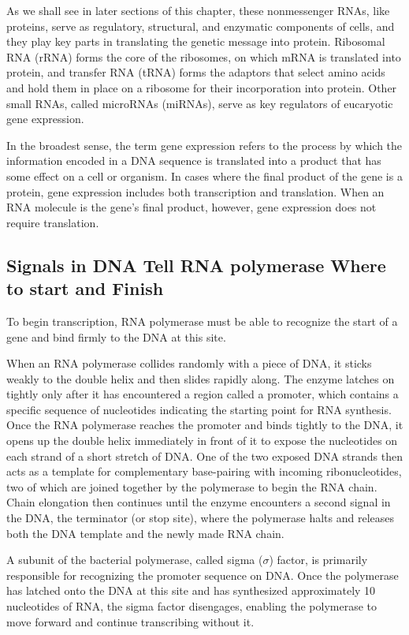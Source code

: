 As we shall see in later sections of this chapter, these nonmessenger RNAs,
like proteins, serve as regulatory, structural, and enzymatic components
of cells, and they play key parts in translating the genetic message into
protein. Ribosomal RNA (rRNA) forms the core of the ribosomes, on which
mRNA is translated into protein, and transfer RNA (tRNA) forms the adaptors
that select amino acids and hold them in place on a ribosome for
their incorporation into protein. Other small RNAs, called microRNAs
(miRNAs), serve as key regulators of eucaryotic gene expression.

In the broadest sense, the term gene expression refers to the process
by which the information encoded in a DNA sequence is translated into
a product that has some effect on a cell or organism. In cases where
the final product of the gene is a protein, gene expression includes both
transcription and translation. When an RNA molecule is the gene’s final
product, however, gene expression does not require translation.

\subsection{Signals in DNA Tell RNA polymerase Where to start and Finish}

To begin transcription, RNA polymerase must be able to recognize the start of
a gene and bind firmly to the DNA at this site.

When an RNA polymerase collides randomly with a piece of DNA,
it sticks weakly to the double helix and then slides rapidly along. The
enzyme latches on tightly only after it has encountered a region called a
promoter, which contains a specific sequence of nucleotides indicating
the starting point for RNA synthesis. Once the RNA polymerase reaches
the promoter and binds tightly to the DNA, it opens up the double helix
immediately in front of it to expose the nucleotides on each strand of a
short stretch of DNA. One of the two exposed DNA strands
then acts as a template for complementary base-pairing with incoming
ribonucleotides, two of which are joined together by the polymerase to
begin the RNA chain. Chain elongation then continues until the enzyme
encounters a second signal in the DNA, the terminator (or stop site),
where the polymerase halts and releases both the DNA template and the
newly made RNA chain.

A subunit of the bacterial polymerase, called sigma ($\sigma$) factor, is primarily
responsible for recognizing the promoter sequence on DNA. Once the
polymerase has latched onto the DNA at this site and has synthesized
approximately 10 nucleotides of RNA, the sigma factor disengages, enabling
the polymerase to move forward and continue transcribing without it.

